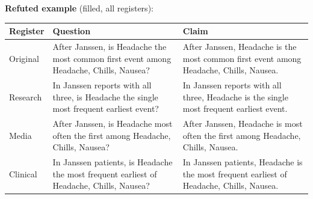 \documentclass[11pt]{article}
\begin{document}
\vspace{3pt}
\textbf{Refuted example} (filled, all registers): \\
\begin{tabularx}{\linewidth}{@{}l L L@{}}
\toprule
\textbf{Register} & \textbf{Question} & \textbf{Claim} \\
\midrule
Original & After Janssen, is Headache the most common first event among Headache, Chills, Nausea? & After Janssen, Headache is the most common first event among Headache, Chills, Nausea. \\
Research & In Janssen reports with all three, is Headache the single most frequent earliest event? & In Janssen reports with all three, Headache is the single most frequent earliest event. \\
Media & After Janssen, is Headache most often the first among Headache, Chills, Nausea? & After Janssen, Headache is most often the first among Headache, Chills, Nausea. \\
Clinical & In Janssen patients, is Headache the most frequent earliest of Headache, Chills, Nausea? & In Janssen patients, Headache is the most frequent earliest of Headache, Chills, Nausea. \\
\bottomrule
\end{tabularx}
\vspace{3pt}
\end{document}
